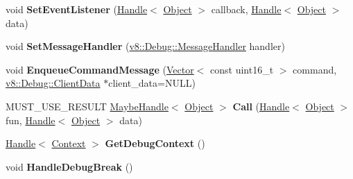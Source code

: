 \begin{DoxyCompactItemize}
\item 
void {\bfseries Set\+Event\+Listener} (\hyperlink{classv8_1_1internal_1_1_handle}{Handle}$<$ \hyperlink{classv8_1_1internal_1_1_object}{Object} $>$ callback, \hyperlink{classv8_1_1internal_1_1_handle}{Handle}$<$ \hyperlink{classv8_1_1internal_1_1_object}{Object} $>$ data)\hypertarget{classv8_1_1internal_1_1_debug_aa1b17c10ac21e9fe519e06ab5185000d}{}\label{classv8_1_1internal_1_1_debug_aa1b17c10ac21e9fe519e06ab5185000d}

\item 
void {\bfseries Set\+Message\+Handler} (\hyperlink{classv8_1_1_debug_a526826b857bd3e3efa184e12bcebc694}{v8\+::\+Debug\+::\+Message\+Handler} handler)\hypertarget{classv8_1_1internal_1_1_debug_a5d583889f8f94fd13fa4a5de12c35788}{}\label{classv8_1_1internal_1_1_debug_a5d583889f8f94fd13fa4a5de12c35788}

\item 
void {\bfseries Enqueue\+Command\+Message} (\hyperlink{classv8_1_1internal_1_1_vector}{Vector}$<$ const uint16\+\_\+t $>$ command, \hyperlink{classv8_1_1_debug_1_1_client_data}{v8\+::\+Debug\+::\+Client\+Data} $\ast$client\+\_\+data=N\+U\+LL)\hypertarget{classv8_1_1internal_1_1_debug_a2270b45d81c0021c5c2e209c6c5a076d}{}\label{classv8_1_1internal_1_1_debug_a2270b45d81c0021c5c2e209c6c5a076d}

\item 
M\+U\+S\+T\+\_\+\+U\+S\+E\+\_\+\+R\+E\+S\+U\+LT \hyperlink{classv8_1_1internal_1_1_maybe_handle}{Maybe\+Handle}$<$ \hyperlink{classv8_1_1internal_1_1_object}{Object} $>$ {\bfseries Call} (\hyperlink{classv8_1_1internal_1_1_handle}{Handle}$<$ \hyperlink{classv8_1_1internal_1_1_object}{Object} $>$ fun, \hyperlink{classv8_1_1internal_1_1_handle}{Handle}$<$ \hyperlink{classv8_1_1internal_1_1_object}{Object} $>$ data)\hypertarget{classv8_1_1internal_1_1_debug_a64447477e4fc2aa1bd086aea3694f514}{}\label{classv8_1_1internal_1_1_debug_a64447477e4fc2aa1bd086aea3694f514}

\item 
\hyperlink{classv8_1_1internal_1_1_handle}{Handle}$<$ \hyperlink{classv8_1_1internal_1_1_context}{Context} $>$ {\bfseries Get\+Debug\+Context} ()\hypertarget{classv8_1_1internal_1_1_debug_a061d85033a27029cee4a89941795b93b}{}\label{classv8_1_1internal_1_1_debug_a061d85033a27029cee4a89941795b93b}

\item 
void {\bfseries Handle\+Debug\+Break} ()\hypertarget{classv8_1_1internal_1_1_debug_a886aab9f010b49880ffe22dd3ebfe192}{}\label{classv8_1_1internal_1_1_debug_a886aab9f010b49880ffe22dd3ebfe192}


\end{DoxyCompactItemize}
